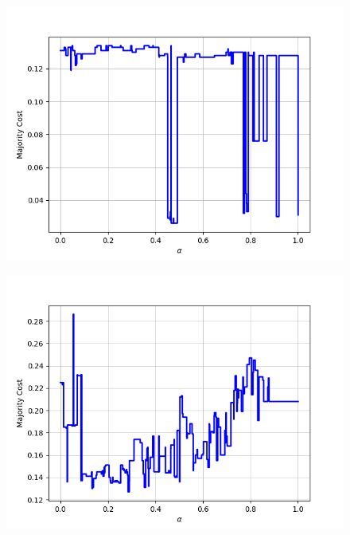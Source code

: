 \begin{figure}[h]
\begin{minipage}{.24\textwidth}
\end{minipage}
\begin{minipage}{.24\textwidth}
  \centering
  {\includegraphics[width=\linewidth]{plots/nell-ac/game}}
\end{minipage}
\begin{minipage}{.24\textwidth}
  \centering
  {\includegraphics[width=\linewidth]{plots/nell-ac/householditem}}
\end{minipage}
\begin{minipage}{.24\textwidth}
  \centering

\end{minipage}
\end{figure}
